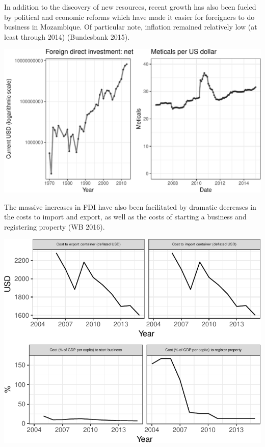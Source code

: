\documentclass[]{article}
\begin{document}
In addition to the discovery of new resources, recent growth has also
been fueled by political and economic reforms which have made it easier
for foreigners to do business in Mozambique. Of particular note,
inflation remained relatively low (at least through 2014) (Bundesbank
2015).

\begin{center}\includegraphics{figures/unnamed-chunk-10-1} \end{center}

The massive increases in FDI have also been facilitated by dramatic
decreases in the costs to import and export, as well as the costs of
starting a business and registering property (WB 2016).

\begin{center}\includegraphics{figures/unnamed-chunk-11-1} \end{center}
\end{document}
